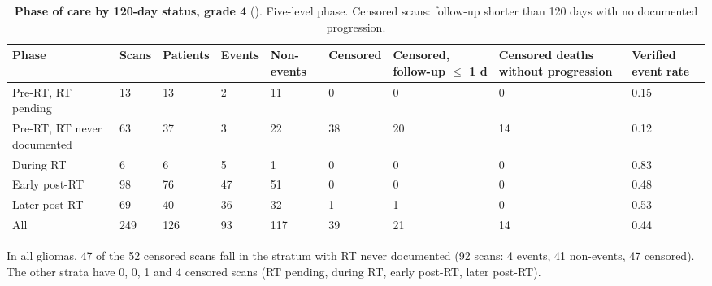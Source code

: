 \documentclass[11pt,a4paper]{article}
\begin{document}
\begin{table}[H]
\centering
\footnotesize
\renewcommand{\thetable}{S28}\renewcommand{\theHtable}{S28}
\caption{\textbf{Phase of care by 120-day status, grade 4}
(). Five-level phase. Censored scans: follow-up shorter than 120 days with no
documented progression.}
\label{tab:S28}
\begin{tabularx}{\linewidth}{@{}L R{0.9cm} R{1.3cm} R{1.0cm} R{1.3cm} R{1.3cm} R{1.7cm} R{1.9cm} R{1.3cm}@{}}
\toprule
Phase & Scans & Patients & Events & Non-events & Censored & Censored, follow-up $\leq$ 1 d & Censored deaths without progression & Verified event rate \\
\midrule
Pre-RT, RT pending & 13 & 13 & 2 & 11 & 0 & 0 & 0 & 0.15 \\
Pre-RT, RT never documented & 63 & 37 & 3 & 22 & 38 & 20 & 14 & 0.12 \\
During RT & 6 & 6 & 5 & 1 & 0 & 0 & 0 & 0.83 \\
Early post-RT & 98 & 76 & 47 & 51 & 0 & 0 & 0 & 0.48 \\
Later post-RT & 69 & 40 & 36 & 32 & 1 & 1 & 0 & 0.53 \\
All & 249 & 126 & 93 & 117 & 39 & 21 & 14 & 0.44 \\
\bottomrule
\end{tabularx}
\end{table}

In all gliomas, 47 of the 52 censored scans fall in the stratum with RT never documented (92 scans: 4 events, 41
non-events, 47 censored). The other strata have 0, 0, 1 and 4 censored scans (RT pending, during RT, early post-RT,
later post-RT).
\end{document}
